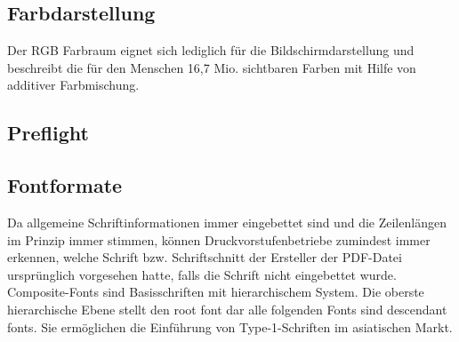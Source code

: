 \subsection{Farbdarstellung}
Der RGB Farbraum eignet sich lediglich für die Bildschirmdarstellung und beschreibt die für den Menschen 16,7 Mio. sichtbaren Farben mit Hilfe von additiver Farbmischung. 


\subsection{Preflight}

\subsection{Fontformate}
Da allgemeine Schriftinformationen immer eingebettet sind und die Zeilenlängen im Prinzip immer stimmen, können Druckvorstufenbetriebe zumindest immer erkennen, welche Schrift bzw. Schriftschnitt der Ersteller der PDF-Datei ursprünglich vorgesehen hatte, falls die Schrift nicht eingebettet wurde.
Composite-Fonts sind Basisschriften mit hierarchischem System. Die oberste hierarchische Ebene stellt den root font dar alle folgenden Fonts sind descendant fonts. Sie ermöglichen die Einführung von Type-1-Schriften im asiatischen Markt. \cite{schneeberger}


